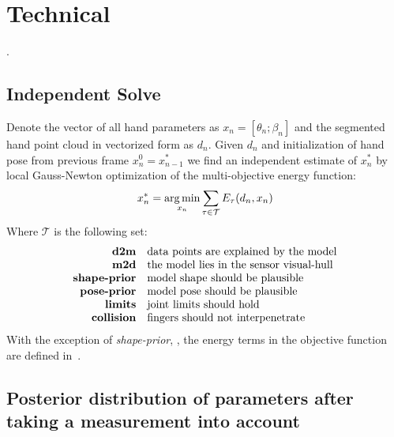 \section{Technical}

.

\subsection{Independent Solve}
\label{sec:independent}
% 
Denote the vector of all hand parameters as $x_n = [\theta_n; \beta_n]$ and the segmented hand point cloud in vectorized form as $d_n$. Given $d_n$ and initialization of hand pose from previous frame $x_n^0 = x_{n - 1}^*$ we find an independent estimate of $x_n^*$ by local Gauss-Newton optimization of the multi-objective energy function:
% 
\begin{equation}
x_n^* = \operatorname*{arg\,min}_{x_n} \sum_{\tau \in \mathcal{T}} E_{\tau}(d_n, x_n) \label{eq:energies}
\end{equation}
% 
Where $\mathcal{T}$ is the following set:
%
\vspace{-.5\parskip}
\begin{equation*}
\setlength{\jot}{0pt}
\begin{aligned}
\text{\textbf{d2m}} & \quad \text{data points are explained by the model} \\ 
\text{\textbf{m2d}} & \quad \text{the model lies in the sensor visual-hull} \\
\text{\textbf{shape-prior}} & \quad \text{model shape should be plausible} \\
\text{\textbf{pose-prior}} & \quad \text{model pose should be plausible} \\
\text{\textbf{limits}} & \quad \text{joint limits should hold} \\
\text{\textbf{collision}} & \quad \text{fingers should not interpenetrate} 
\end{aligned}
\end{equation*}
With the exception of \emph{shape-prior}, , the energy terms in the objective function are defined in~\cite{tkach2016sphere}.

\subsection{Posterior distribution of parameters after taking a measurement into account} \label{sec:posterior}

